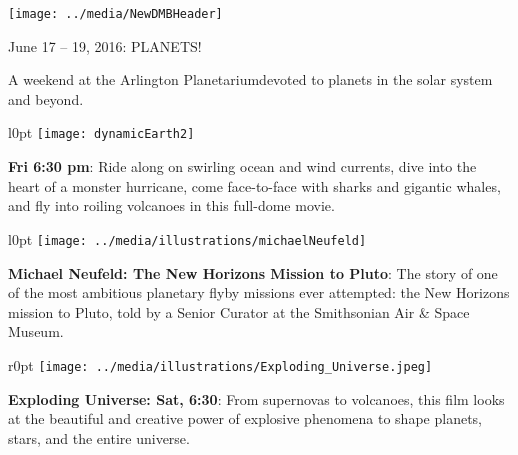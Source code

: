 \documentclass{article}
\begin{document}
\texttt{[image: ../media/NewDMBHeader]}
   \begin{centering}
     {\fontsize{28}{8}
  
        June 17 – 19, 2016: PLANETS!
     }

     {\fontsize{19}{19}
      
        A weekend at the Arlington Planetarium\break devoted to 
        planets in the solar system and beyond.

     }
  
   \end{centering}


     {\fontsize{20}{22}

     \begin{wrapfigure}[5]{l}{0pt}
       \texttt{[image: dynamicEarth2]}
     \end{wrapfigure}      
     
      \textbf{Fri  6:30 pm}: Ride along on swirling ocean and wind currents, dive into the heart of a monster hurricane, come face-to-face with sharks and gigantic whales, and fly into roiling volcanoes in this full-dome movie.

       }
       

   {\fontsize{20}{24}

   \begin{wrapfigure}[5]{l}{0pt}
      \texttt{[image: ../media/illustrations/michaelNeufeld]}
   \end{wrapfigure}      
   
   \textbf{Michael Neufeld: The New Horizons Mission to Pluto}: 
      The story of one of the most ambitious planetary flyby missions ever attempted: the New Horizons mission to Pluto,
      told by a Senior Curator at the Smithsonian Air \& Space Museum.
      
   }


   {\fontsize{18}{20}


 \begin{wrapfigure}[6]{r}{0pt}
   \texttt{[image: ../media/illustrations/Exploding\_Universe.jpeg]}
 \end{wrapfigure}      

     \textbf{Exploding Universe: Sat, 6:30}: From supernovas to volcanoes, this film looks at the beautiful and creative power of explosive phenomena to shape planets, stars, and the entire universe.

   }
\end{document}

